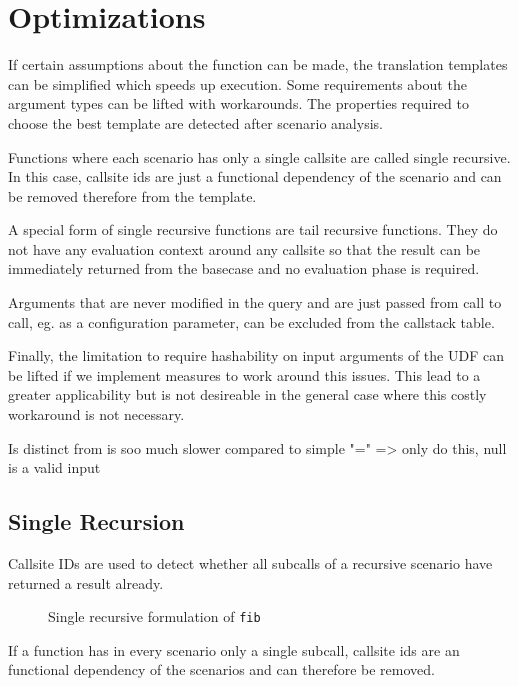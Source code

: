 \chapter{Optimizations}

If certain assumptions about the function can be made, the translation templates can be simplified which speeds up execution. Some requirements about the argument types can be lifted with workarounds. The properties required to choose the best template are detected after scenario analysis.

Functions where each scenario has only a single callsite are called single recursive. In this case, callsite ids  are just a functional dependency of the scenario and can be removed therefore from the template.

A special form of single recursive functions are tail recursive functions. They do not have any evaluation context around any callsite so that the result can be immediately returned from the basecase and no evaluation phase is required.

Arguments that are never modified in the query and are just passed from call to call, eg. as a configuration parameter, can be excluded from the callstack table.

Finally, the limitation to require hashability on input arguments of the UDF can be lifted if we implement measures to work around this issues. This lead to a greater applicability but is not desireable in the general case where this costly workaround is not necessary.

Is distinct from is soo much slower compared to simple "=" => only do this, null is a valid input




\section{Single Recursion}
Callsite IDs are used to detect whether all subcalls of a recursive scenario have returned a result already.

\begin{wrapfigure}{r}{0.5\textwidth}
  \vspace{-20pt}
  \caption{Single recursive formulation of \texttt{fib}}
  \label{lst:fib_tr}
\end{wrapfigure}

If a function has in every scenario only a single subcall, callsite ids are an functional dependency of the scenarios and can therefore be removed.

